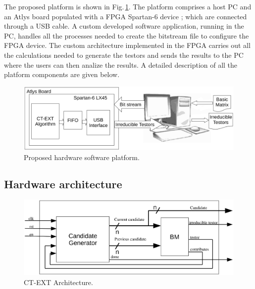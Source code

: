 \documentclass[authoryear,preprint,review,12pt]{elsarticle}
\begin{document}
The proposed platform is shown in Fig.\,\ref{figArq}. The platform comprises a host PC and 
an Atlys board populated with a FPGA Spartan-6 device \citep{R15}; which are connected through a USB cable. A custom developed software application,
running in the PC, handles all the processes needed to create the bitstream file to configure the FPGA device. The custom architecture implemented in the 
FPGA carries out all the calculations needed to generate the testors and sends the results to the PC where the users can then analize the results. A detailed description of all the platform components are given below.

\begin{figure}[htb]
    \begin{center}
       \includegraphics[width=13cm]{Arquitecture.eps}
    \end{center}
\caption{Proposed hardware software platform.}
\label{figArq}
\end{figure}

\subsection{Hardware architecture}
\label{sect:4}

\begin{figure}[htb]
    \begin{center}
        \includegraphics[width=13cm]{CT-ext_arq.eps}
    \end{center}
\caption{CT-EXT Architecture.}
\label{fig:3}
\end{figure}
\end{document}
